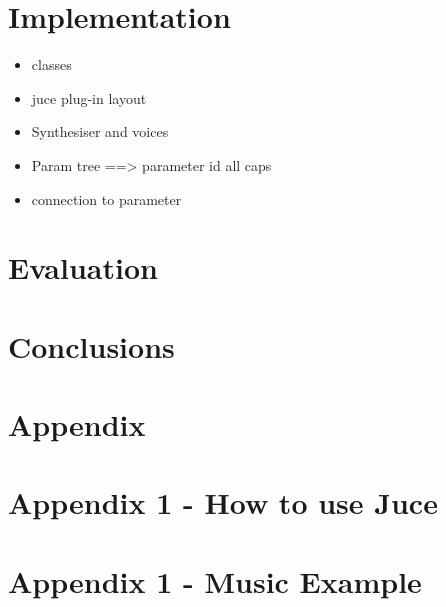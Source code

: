 \documentclass{article}
\begin{document}
	
	\section{Implementation}
	
	\begin{itemize}
		\item classes
		\item juce plug-in layout
		\item Synthesiser and voices
		\item Param tree ==> parameter id all caps
		\item connection to parameter
	\end{itemize}
	

	
	\section{Evaluation}
	
	\section{Conclusions}
	
	\section{Appendix}
	\section{Appendix 1 - How to use Juce}
	\section{Appendix 1 - Music Example}
	
\end{document}
